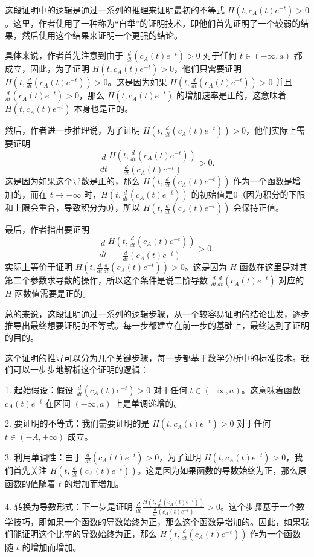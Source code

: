 \begin{remark}
  这段证明中的逻辑是通过一系列的推理来证明最初的不等式 $H(t,c_{A}(t)e^{-t})>0$。这里，作者使用了一种称为“自举”的证明技术，即他们首先证明了一个较弱的结果，然后使用这个结果来证明一个更强的结论。

具体来说，作者首先注意到由于 $\frac{d}{dt}(c_{A}(t)e^{-t})>0$ 对于任何 $t \in (-\infty,a)$ 都成立，因此，为了证明 $H(t,c_{A}(t)e^{-t})>0$，他们只需要证明 $H(t,\frac{d}{dt}(c_{A}(t)e^{-t}))>0$。这是因为如果 $H(t,\frac{d}{dt}(c_{A}(t)e^{-t}))>0$ 并且 $\frac{d}{dt}(c_{A}(t)e^{-t})>0$，那么 $H(t,c_{A}(t)e^{-t})$ 的增加速率是正的，这意味着 $H(t,c_{A}(t)e^{-t})$ 本身也是正的。

然后，作者进一步推理说，为了证明 $H(t,\frac{d}{dt}(c_{A}(t)e^{-t}))>0$，他们实际上需要证明 
$$\frac{d}{dt}\frac{H(t,\frac{d}{dt}(c_{A}(t)e^{-t}))}{\frac{d}{dt}(c_{A}(t)e^{-t})}>0.$$ 这是因为如果这个导数是正的，那么 $H(t,\frac{d}{dt}(c_{A}(t)e^{-t}))$ 作为一个函数是增加的，而在 $t \rightarrow -\infty$ 时，$H(t,\frac{d}{dt}(c_{A}(t)e^{-t}))$ 的初始值是0（因为积分的下限和上限会重合，导致积分为0），所以 $H(t,\frac{d}{dt}(c_{A}(t)e^{-t}))$ 会保持正值。

最后，作者指出要证明 $$\frac{d}{dt}\frac{H(t,\frac{d}{dt}(c_{A}(t)e^{-t}))}{\frac{d}{dt}(c_{A}(t)e^{-t})}>0,$$  实际上等价于证明 $H(t,\frac{d}{dt}\frac{d}{dt}(c_{A}(t)e^{-t}))>0$。这是因为 $H$ 函数在这里是对其第二个参数求导数的操作，所以这个条件是说二阶导数 $\frac{d}{dt}\frac{d}{dt}(c_{A}(t)e^{-t})$ 对应的 $H$ 函数值需要是正的。

总的来说，这段证明通过一系列的逻辑步骤，从一个较容易证明的结论出发，逐步推导出最终想要证明的不等式。每一步都建立在前一步的基础上，最终达到了证明的目的。

这个证明的推导可以分为几个关键步骤，每一步都基于数学分析中的标准技术。我们可以一步步地解析这个证明的逻辑：

1. 起始假设：假设 $\frac{d}{dt}(c_{A}(t)e^{-t})>0$ 对于任何 $t\in(-\infty,a)$。这意味着函数 $c_{A}(t)e^{-t}$ 在区间 $(-\infty,a)$ 上是单调递增的。

2. 要证明的不等式：我们需要证明的是 $H(t,c_{A}(t)e^{-t})>0$ 对于任何 $t\in(-A,+\infty)$ 成立。

3. 利用单调性：由于 $\frac{d}{dt}(c_{A}(t)e^{-t})>0$，为了证明 $H(t,c_{A}(t)e^{-t})>0$，我们首先关注 $H(t,\frac{d}{dt}(c_{A}(t)e^{-t}))$。这是因为如果函数的导数始终为正，那么原函数的值随着 $t$ 的增加而增加。

4. 转换为导数形式：下一步是证明 $\frac{d}{dt}\frac{H(t,\frac{d}{dt}(c_{A}(t)e^{-t}))}{\frac{d}{dt}(c_{A}(t)e^{-t})}>0$。这个步骤基于一个数学技巧，即如果一个函数的导数始终为正，那么这个函数是增加的。因此，如果我们能证明这个比率的导数始终为正，那么 $H(t,\frac{d}{dt}(c_{A}(t)e^{-t}))$ 作为一个函数随 $t$ 的增加而增加。


\end{remark}
